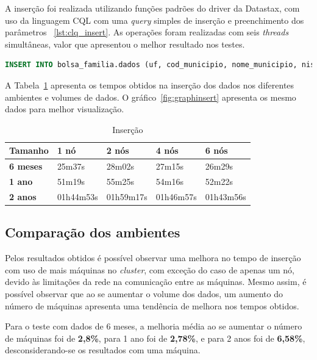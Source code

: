 A inserção foi realizada utilizando funções padrões do driver da Datastax, com uso da linguagem CQL com uma \emph{query} simples de inserção e preenchimento dos parâmetros ~\ref{lst:clq_insert}. As operações foram realizadas com seis \emph{threads} simultâneas, valor que apresentou o melhor resultado nos testes. 

\begin{lstlisting}[caption={Código CQL para inserção},label={lst:clq_insert},language=SQL]
INSERT INTO bolsa_familia.dados (uf, cod_municipio, nome_municipio, nis_favorecido, nome_favorecido, fonte, valor, periodo) VALUES (?, ?, ?, ?, ?, ?, ?, ?)
\end{lstlisting}

A Tabela~\ref{tb_insert} apresenta os tempos obtidos na inserção dos dados nos diferentes ambientes e volumes de dados. O gráfico~\ref{fig:graphinsert} apresenta os mesmo dados para melhor visualização.


\begin{table}[]
	\centering
	\caption{Inserção}
	\label{tb_insert}
	\begin{tabular}{lllll}
		\textbf{Tamanho}	& \textbf{1 nó} & \textbf{2 nós} & \textbf{4 nós} & \textbf{6 nós} \\ \hline
		\textbf{6 meses}    & 25m37s        & 28m02s         & 27m15s         & 26m29s         \\ \hline
		\textbf{1 ano}      & 51m19s        & 55m25s         & 54m16s         & 52m22s         \\ \hline
		\textbf{2 anos}     & 01h44m53s     & 01h59m17s      & 01h46m57s      & 01h43m56s      \\ \hline
	\end{tabular}
\end{table}

\subsection{Comparação dos ambientes}

Pelos resultados obtidos é possível observar uma melhora no tempo de inserção com uso de mais máquinas no \emph{cluster}, com exceção do caso de apenas um nó, devido às limitações da rede na comunicação entre as máquinas. Mesmo assim, é possível observar que ao se aumentar o volume dos dados, um aumento do número de máquinas apresenta uma tendência de melhora nos tempos obtidos.

Para o teste com dados de 6 meses, a melhoria média ao se aumentar o número de máquinas foi de \textbf{2,8\%}, para 1 ano foi de \textbf{2,78\%}, e para 2 anos foi de \textbf{6,58\%}, desconsiderando-se os resultados com uma máquina.

